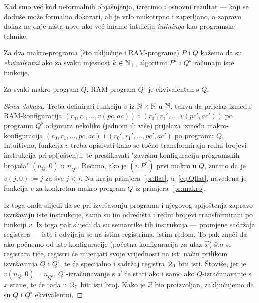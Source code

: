 Kad smo već kod neformalnih objašnjenja, izrecimo i osnovni rezultat --- koji se doduše može formalno dokazati, ali je vrlo mukotrpno i zapetljano, a zapravo dokaz ne daje ništa novo ako već imamo intuiciju \emph{inlininga} kao programske tehnike.

\begin{definicija}
Za dva makro-programa (što uključuje i RAM-programe) $P$ i $Q$ kažemo da su \emph{ekvivalentni} ako za svaku mjesnost $k\in{\mathbb N}_+$, algoritmi $P^k$ i $Q^k$ računaju iste funkcije.
\end{definicija}

\begin{teorem}\label{tm:rem}
Za svaki makro-program $Q$, RAM-program $Q^\flat$ je ekvivalentan s $Q$.
\end{teorem}
\begin{proof}[Skica dokaza]
Treba definirati funkciju $v$ iz ${\mathbb N}\times{\mathbb N}$ u ${\mathbb N}$, takvu da prijelaz između RAM-konfiguracija $(r_0,r_1,\dotsc,v(pc,ac))$ i $(r_0',r_1',\dotsc,v(pc',ac'))$ po programu $Q^\flat$ odgovara nekoliko (jednom ili više) prijelaza između makro-konfiguracija $(r_0,r_1,\dotsc,pc,ac)$ i $(r_0',r_1',\dotsc,pc',ac')$ po programu $Q$. Intuitivno, funkcija $v$ treba opisivati kako se točno transformiraju redni brojevi instrukcija pri spljoštenju, te preslikavati "završnu konfiguraciju programskih brojača" $(n_Q,0)$ u $n_{Q^\flat}$. Recimo, ako je $(i.\,P^*)$ prvi makro u $Q$, znamo da je $v(j,0):=j$ za sve $j<i$. Na kraju primjera~\ref{pr:flat}, u~\eqref{eq:Qflat}, navedena je funkcija $v$ za konkretan makro-program $Q$ iz primjera~\ref{pr:makro}.

Iz toga onda slijedi da se pri izvršavanju programa i njegovog spljoštenja zapravo izvršavaju iste instrukcije, samo su im odredišta i redni brojevi transformirani po funkciji $v$. Iz toga pak slijedi da su semantike tih instrukcija --- promjene sadržaja registara --- iste i odvijaju se na istim registrima, istim redom. To pak znači da ako počnemo od iste konfiguracije (početna konfiguracija za ulaz $\vec x$) što se registara tiče, registri će mijenjati svoje vrijednosti na isti način prilikom izvršavanja $Q$ i $Q^\flat$, te će specijalno i sadržaj registra $\mathcal R_{0}$ biti isti. Štoviše, jer je $v(n_Q,0)=n_{Q^\flat}$, $Q^\flat$-izračunavanje s $\vec x$ će stati ako i samo ako $Q$-izračunavanje s $x$ stane, te će tada u $\mathcal R_{0}$ biti isti broj. Kako je $\vec x$ bio proizvoljan, zaključujemo da su $Q$ i $Q^\flat$ ekvivalentni.
\end{proof}

